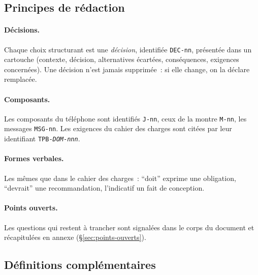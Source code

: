 \subsection{Principes de rédaction}

\paragraph{Décisions.} Chaque choix structurant est une \emph{décision}, identifiée
\texttt{DEC-nn}, présentée dans un cartouche (contexte, décision, alternatives écartées,
conséquences, exigences concernées). Une décision n'est jamais supprimée~: si elle change,
on la déclare remplacée.

\paragraph{Composants.} Les composants du téléphone sont identifiés \texttt{J-nn}, ceux de la
montre \texttt{M-nn}, les messages \texttt{MSG-nn}. Les exigences du cahier des charges sont
citées par leur identifiant \texttt{TPB-\textit{DOM}-\textit{nnn}}.

\paragraph{Formes verbales.} Les mêmes que dans le cahier des charges~: \enquote{doit}
exprime une obligation, \enquote{devrait} une recommandation, l'indicatif un fait de
conception.

\paragraph{Points ouverts.} Les questions qui restent à trancher sont signalées dans le corps
du document et récapitulées en annexe (§\ref{sec:points-ouverts}).

\subsection{Définitions complémentaires}

